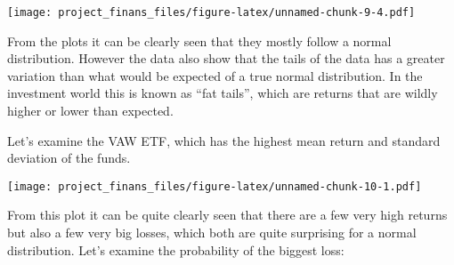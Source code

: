 \documentclass[
]{article}
\newenvironment{Shaded}{\begin{snugshade}}{\end{snugshade}}
\newcommand{\AttributeTok}[1]{\textcolor[rgb]{0.77,0.63,0.00}{#1}}
\newcommand{\CommentTok}[1]{\textcolor[rgb]{0.56,0.35,0.01}{\textit{#1}}}
\newcommand{\ConstantTok}[1]{\textcolor[rgb]{0.00,0.00,0.00}{#1}}
\newcommand{\ControlFlowTok}[1]{\textcolor[rgb]{0.13,0.29,0.53}{\textbf{#1}}}
\newcommand{\DecValTok}[1]{\textcolor[rgb]{0.00,0.00,0.81}{#1}}
\newcommand{\FloatTok}[1]{\textcolor[rgb]{0.00,0.00,0.81}{#1}}
\newcommand{\FunctionTok}[1]{\textcolor[rgb]{0.00,0.00,0.00}{#1}}
\newcommand{\NormalTok}[1]{#1}
\newcommand{\OtherTok}[1]{\textcolor[rgb]{0.56,0.35,0.01}{#1}}
\newcommand{\SpecialCharTok}[1]{\textcolor[rgb]{0.00,0.00,0.00}{#1}}
\newcommand{\StringTok}[1]{\textcolor[rgb]{0.31,0.60,0.02}{#1}}
\begin{document}
\texttt{[image: project\_finans\_files/figure-latex/unnamed-chunk-9-4.pdf]}

From the plots it can be clearly seen that they mostly follow a normal
distribution. However the data also show that the tails of the data has
a greater variation than what would be expected of a true normal
distribution. In the investment world this is known as ``fat tails'',
which are returns that are wildly higher or lower than expected.

Let's examine the VAW ETF, which has the highest mean return and
standard deviation of the funds.

\begin{Shaded}
\end{Shaded}

\texttt{[image: project\_finans\_files/figure-latex/unnamed-chunk-10-1.pdf]}

From this plot it can be quite clearly seen that there are a few very
high returns but also a few very big losses, which both are quite
surprising for a normal distribution. Let's examine the probability of
the biggest loss:
\end{document}
